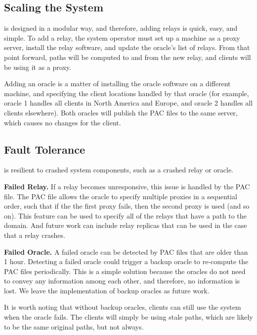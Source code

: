 

\subsection{Scaling the System}
\system{} is 
designed in a modular way, and therefore, adding relays is quick, easy, and 
simple.  To add a relay, the system operator must set up a machine as a proxy 
server, install the \system{} relay software, and update the oracle's list of 
relays.  From that point forward, paths will be computed to and from the new 
relay, and clients will be using it as a proxy.  

Adding an oracle is a matter of installing the oracle software on 
a different machine, and specifying the client locations handled by that oracle 
(for example, oracle 1 handles all clients in North America and Europe, and 
oracle 2 handles all clients elsewhere).  Both oracles will publish the PAC files 
to the same server, which causes no changes for the client.

\subsection{Fault Tolerance}
\system{} is resilient to crashed system components, such as a crashed relay or 
oracle.  

{\bf Failed Relay.} If a relay becomes unresponsive, this issue is handled by 
the PAC file.  The PAC file allows the oracle to specify multiple proxies in 
a sequential order, such that if the the first proxy fails, then the second 
proxy is used (and so on).  This feature can be used to specify all of the 
relays that have a path to the domain.  And future work can include relay 
replicas that can be used in the case that a relay crashes.

{\bf Failed Oracle.} A failed oracle can be detected by PAC files that are 
older than 1 hour.  Detecting a failed oracle could trigger a backup oracle 
to re-compute the PAC files periodically.  This is a simple solution because 
the oracles do not need to convey any information among each other, and therefore, 
no information is lost.  We leave the implementation of backup oracles as future 
work.

It is worth noting that without backup oracles, clients can still use the system 
when the oracle fails.  The clients will simply be using stale paths, which are 
likely to be the same original paths, but not always.  


